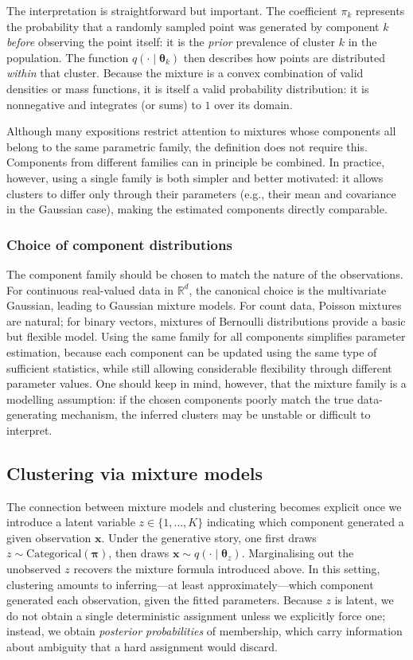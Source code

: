 The interpretation is straightforward but important. The coefficient $\pi_k$ represents the
probability that a randomly sampled point was generated by component $k$
\emph{before} observing the point itself: it is the \emph{prior} prevalence of cluster $k$
in the population. The function $q(\cdot\mid\boldsymbol{\theta}_k)$ then describes how
points are distributed \emph{within} that cluster. Because the mixture is a convex
combination of valid densities or mass functions, it is itself a valid probability distribution:
it is nonnegative and integrates (or sums) to $1$ over its domain.

Although many expositions restrict attention to mixtures whose components all belong to
the same parametric family, the definition does not require this. Components from different
families can in principle be combined. In practice, however, using a single family is both
simpler and better motivated: it allows clusters to differ only through their parameters
(e.g., their mean and covariance in the Gaussian case), making the estimated components
directly comparable.

\subsubsection*{Choice of component distributions}

The component family should be chosen to match the nature of the observations. For
continuous real-valued data in $\mathbb{R}^d$, the canonical choice is the multivariate
Gaussian, leading to Gaussian mixture models. For count data, Poisson mixtures are
natural; for binary vectors, mixtures of Bernoulli distributions provide a basic but flexible
model. Using the same family for all components simplifies parameter estimation, because
each component can be updated using the same type of sufficient statistics, while still
allowing considerable flexibility through different parameter values. One should keep in
mind, however, that the mixture family is a modelling assumption: if the chosen
components poorly match the true data-generating mechanism, the inferred clusters may be
unstable or difficult to interpret.

\subsection*{Clustering via mixture models}

The connection between mixture models and clustering becomes explicit once we introduce
a latent variable $z\in\{1,\ldots,K\}$ indicating which component generated a given
observation $\mathbf{x}$. Under the generative story, one first draws
$z\sim\text{Categorical}(\boldsymbol{\pi})$, then draws
$\mathbf{x}\sim q(\cdot\mid\boldsymbol{\theta}_z)$. Marginalising out the unobserved $z$
recovers the mixture formula introduced above. In this setting, clustering amounts to
inferring---at least approximately---which component generated each observation, given
the fitted parameters. Because $z$ is latent, we do not obtain a single deterministic
assignment unless we explicitly force one; instead, we obtain \emph{posterior probabilities}
of membership, which carry information about ambiguity that a hard assignment would
discard.

